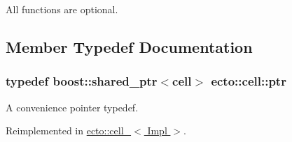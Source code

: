 \-All functions are optional. 

\subsection{\-Member \-Typedef \-Documentation}
\hypertarget{structecto_1_1cell_af2cab9d2bc012088c4f58c40da57a862}{
\subsubsection[{ptr}]{\setlength{\rightskip}{0pt plus 5cm}typedef boost\-::shared\-\_\-ptr$<${\bf cell}$>$ {\bf ecto\-::cell\-::ptr}}}\label{structecto_1_1cell_af2cab9d2bc012088c4f58c40da57a862}


\-A convenience pointer typedef. 



\-Reimplemented in \hyperlink{structecto_1_1cell___a26d9e255a2ba0335c5e90fd04efa6bfa}{ecto\-::cell\-\_\-$<$ Impl $>$}.



